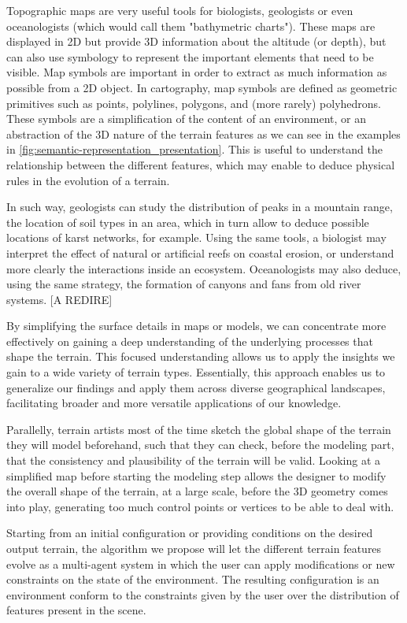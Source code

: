 Topographic maps are very useful tools for biologists, geologists or even oceanologists (which would call them "bathymetric charts"). These maps are displayed in 2D but provide 3D information about the altitude (or depth), but can also use symbology to represent the important elements that need to be visible. Map symbols are important in order to extract as much information as possible from a 2D object. In cartography, map symbols are defined as geometric primitives such as points, polylines, polygons, and (more rarely) polyhedrons. These symbols are a simplification of the content of an environment, or an abstraction of the 3D nature of the terrain features as we can see in the examples in \cref{fig:semantic-representation_presentation}. This is useful to understand the relationship between the different features, which may enable to deduce physical rules in the evolution of a terrain. 

In such way, geologists can study the distribution of peaks in a mountain range, the location of soil types in an area, which in turn allow to deduce possible locations of karst networks, for example. Using the same tools, a biologist may interpret the effect of natural or artificial reefs on coastal erosion, or understand more clearly the interactions inside an ecosystem. Oceanologists may also deduce, using the same strategy, the formation of canyons and fans from old river systems. [A REDIRE]

By simplifying the surface details in maps or models, we can concentrate more effectively on gaining a deep understanding of the underlying processes that shape the terrain. This focused understanding allows us to apply the insights we gain to a wide variety of terrain types. Essentially, this approach enables us to generalize our findings and apply them across diverse geographical landscapes, facilitating broader and more versatile applications of our knowledge.

Parallelly, terrain artists most of the time sketch the global shape of the terrain they will model beforehand, such that they can check, before the modeling part, that the consistency and plausibility of the terrain will be valid. Looking at a simplified map before starting the modeling step allows the designer to modify the overall shape of the terrain, at a large scale, before the 3D geometry comes into play, generating too much control points or vertices to be able to deal with.

Starting from an initial configuration or providing conditions on the desired output terrain, the algorithm we propose will let the different terrain features evolve as a multi-agent system in which the user can apply modifications or new constraints on the state of the environment. The resulting configuration is an environment conform to the constraints given by the user over the distribution of features present in the scene.


